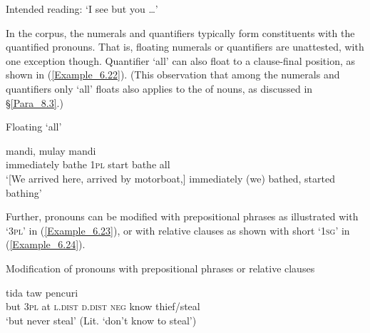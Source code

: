 \glt
Intended reading: ‘I see  but you {\ldots}’ \textstyleExampleSource{[Elicited ME151112.002]}
\z


In the corpus, the numerals and quantifiers typically form constituents with the quantified pronouns. That is, floating numerals or quantifiers are unattested, with one exception though. Quantifier  ‘all’ can also float to a clause-final position, as shown in (\ref{Example_6.22}). (This observation that among the numerals and quantifiers only   ‘all’ floats also applies to the  of nouns, as discussed in §\ref{Para_8.3}.)



\begin{styleExampleTitle}
Floating   ‘all’
\end{styleExampleTitle}

\ea
\label{Example_6.22}
 {mandi,} {} {mulay} {mandi} {}\\ %
 immediately  bathe  \textsc{1pl}  start  bathe  all\\

\glt
‘[We arrived here, arrived by motorboat,] immediately (we) bathed,  started  bathing’ \textstyleExampleSource{[080917-008-NP.0131]}
\z



Further, pronouns can be modified with prepositional phrases as illustrated with  ‘\textsc{3pl}’ in (\ref{Example_6.23}), or with relative clauses as shown with short  ‘\textsc{1sg}’ in (\ref{Example_6.24}).



\begin{styleExampleTitle}
Modification of pronouns with prepositional phrases or relative clauses
\end{styleExampleTitle}

\ea
\label{Example_6.23}
 {} {} {} {} {tida} {taw} {pencuri}\\ %
 but  \textsc{3pl}  at  \textsc{l.dist}  \textsc{d.dist}  \textsc{neg}  know  thief/steal\\

\glt
‘but \bluebold{)} never steal’ (Lit. ‘don’t know to steal’) \textstyleExampleSource{[081011-022-Cv.0293]}
\z

